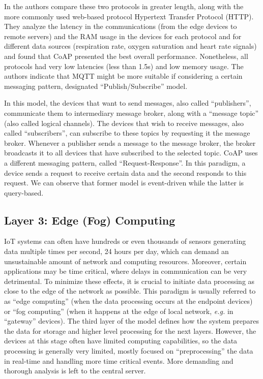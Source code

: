 In \cite{Rubi2019} the authors compare these two protocols in greater length, along with the more commonly used web-based protocol Hypertext Transfer Protocol (HTTP). They analyze the latency in the communications (from the edge devices to remote servers) and the RAM usage in the devices for each protocol and for different data sources (respiration rate, oxygen saturation and heart rate signals) and found that \acs{CoAP} presented the best overall performance. Nonetheless, all protocols had very low latencies (less than 1.5s) and low memory usage. The authors indicate that \acs{MQTT} might be more suitable if considering a certain messaging pattern, designated ``Publish/Subscribe'' model. \bigskip

In this model, the devices that want to send messages, also called ``publishers'', communicate them to intermediary message broker, along with a ``message topic'' (also called logical channels). The devices that wish to receive messages, also called ``subscribers'', can subscribe to these topics by requesting it the message broker. Whenever a publisher sends a message to the message broker, the broker broadcasts it to all devices that have subscribed to the selected topic. \acs{CoAP} uses a different messaging pattern, called ``Request-Response''. In this paradigm, a device sends a request to receive certain data and the second responds to this request. We can observe that former model is event-driven while the latter is query-based. %

\subsection{Layer 3: Edge (Fog) Computing}
\label{sec:iot-model-layer3}

\acs{IoT} systems can often have hundreds or even thousands of sensors generating data multiple times per second, 24 hours per day, which can demand an unsustainable amount of network and computing resources. Moreover, certain applications may be time critical, where delays in communication can be very detrimental. To minimize these effects, it is crucial to initiate data processing as close to the edge of the network as possible. This paradigm is usually referred to as ``edge computing'' (when the data processing occurs at the endpoint devices) or ``fog computing'' (when it happens at the edge of local network, \textit{e.g.} in ``gateway'' devices). The third layer of the model defines how the system prepares the data for storage and higher level processing for the next layers. However, the devices at this stage often have limited computing capabilities, so the data processing is generally very limited, mostly focused on ``preprocessing'' the data in real-time and handling more time critical events. More demanding and thorough analysis is left to the central server. \bigskip

